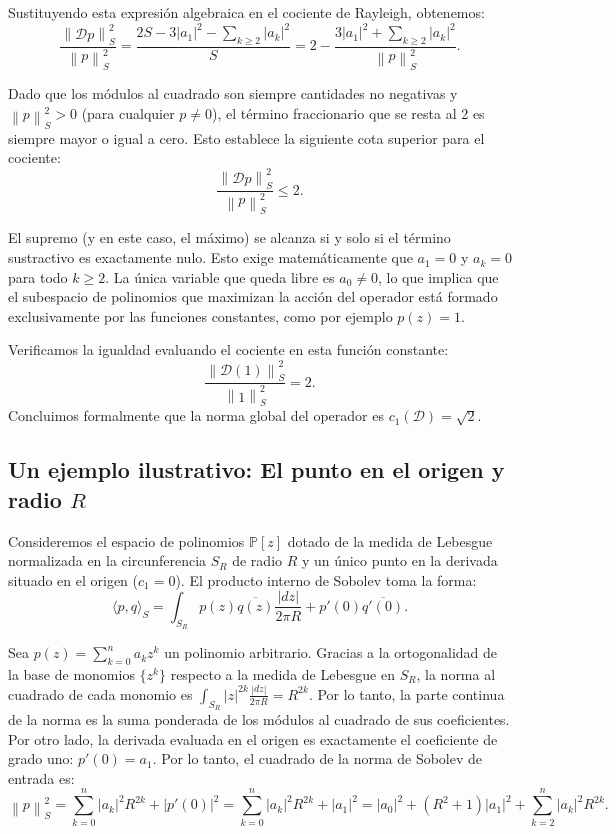 \documentclass[12pt,a4paper]{article}
\theoremstyle{definition}
\theoremstyle{remark}
\newcommand{\Poly}{\mathbb{P}[z]}
\newcommand{\norm}[1]{\left\| #1 \right\|_S}
\newcommand{\abs}[1]{\left| #1 \right|}
\newcommand{\ip}[2]{\langle #1, #2 \rangle_S}
\newcommand{\D}{\mathcal{D}}
\begin{document}
Sustituyendo esta expresión algebraica en el cociente de Rayleigh, obtenemos:
\begin{equation}
    \frac{\norm{\D p}^2}{\norm{p}^2} = \frac{2S - 3\abs{a_1}^2 - \sum_{k \ge 2} \abs{a_k}^2}{S} = 2 - \frac{3\abs{a_1}^2 + \sum_{k \ge 2} \abs{a_k}^2}{\norm{p}^2}.
\end{equation}

Dado que los módulos al cuadrado son siempre cantidades no negativas y $\norm{p}^2 > 0$ (para cualquier $p \neq 0$), el término fraccionario que se resta al 2 es siempre mayor o igual a cero. Esto establece la siguiente cota superior para el cociente:
$$ \frac{\norm{\D p}^2}{\norm{p}^2} \le 2. $$

El supremo (y en este caso, el máximo) se alcanza si y solo si el término sustractivo es exactamente nulo. Esto exige matemáticamente que $a_1 = 0$ y $a_k = 0$ para todo $k \ge 2$. La única variable que queda libre es $a_0 \neq 0$, lo que implica que el subespacio de polinomios que maximizan la acción del operador está formado exclusivamente por las funciones constantes, como por ejemplo $p(z) = 1$.

Verificamos la igualdad evaluando el cociente en esta función constante:
$$ \frac{\norm{\D(1)}^2}{\norm{1}^2} = 2. $$
Concluimos formalmente que la norma global del operador es $c_1(\D) = \sqrt{2}$.

\subsection{Un ejemplo ilustrativo: El punto en el origen y radio $R$}

Consideremos el espacio de polinomios $\Poly$ dotado de la medida de Lebesgue normalizada en la circunferencia $S_R$ de radio $R$ y un único punto en la derivada situado en el origen ($c_1 = 0$). El producto interno de Sobolev toma la forma:
\begin{equation}
    \ip{p}{q} = \int_{S_R} p(z)\overline{q(z)} \frac{\abs{dz}}{2\pi R} + p'(0)\overline{q'(0)}.
\end{equation}

Sea $p(z) = \sum_{k=0}^n a_k z^k$ un polinomio arbitrario. Gracias a la ortogonalidad de la base de monomios $\{z^k\}$ respecto a la medida de Lebesgue en $S_R$, la norma al cuadrado de cada monomio es $\int_{S_R} \abs{z}^{2k} \frac{\abs{dz}}{2\pi R} = R^{2k}$. Por lo tanto, la parte continua de la norma es la suma ponderada de los módulos al cuadrado de sus coeficientes. Por otro lado, la derivada evaluada en el origen es exactamente el coeficiente de grado uno: $p'(0) = a_1$.
Por lo tanto, el cuadrado de la norma de Sobolev de entrada es:
\begin{equation} \label{eq:norma_in_0_R}
    \norm{p}^2 = \sum_{k=0}^n \abs{a_k}^2 R^{2k} + \abs{p'(0)}^2 = \sum_{k=0}^n \abs{a_k}^2 R^{2k} + \abs{a_1}^2 = \abs{a_0}^2 + (R^2 + 1)\abs{a_1}^2 + \sum_{k=2}^n \abs{a_k}^2 R^{2k}.
\end{equation}
\end{document}
